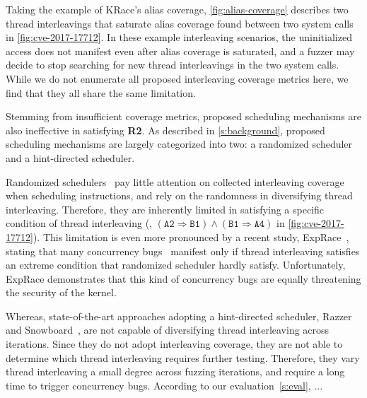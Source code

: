 Taking the example of KRace's alias coverage,
\autoref{fig:alias-coverage} describes two thread interleavings that
saturate alias coverage found between two system calls in
\autoref{fig:cve-2017-17712}.
%
In these example interleaving scenarios, the uninitialized access does
not manifest even after alias coverage is saturated, and a fuzzer may
decide to stop searching for new thread interleavings in the two
system calls.
%
While we do not enumerate all proposed interleaving coverage metrics
here, we find that they all share the same limitation.


%
Stemming from insufficient coverage metrics, proposed scheduling
mechanisms are also ineffective in satisfying \textbf{R2}.
%
As described in \autoref{s:background}, proposed scheduling mechanisms
are largely categorized into two: a randomized scheduler and a
hint-directed scheduler.

%
Randomized schedulers~\cite{krace, pctalgorithm, muzz, ski} pay little
attention on collected interleaving coverage when scheduling
instructions, and rely on the randomness in diversifying thread
interleaving.
%
Therefore, they are inherently limited in satisfying a specific
condition of thread interleaving (\eg,
$(\texttt{A2} \Rightarrow \texttt{B1}) \wedge (\texttt{B1} \Rightarrow
\texttt{A4})$ in \autoref{fig:cve-2017-17712}).
%
This limitation is even more pronounced by a recent study,
ExpRace~\cite{exprace}, stating that many concurrency
bugs~\cite{cve20196974, cve20191999, cve201911486} manifest only if
thread interleaving satisfies an extreme condition that randomized
scheduler hardly satisfy.
%
Unfortunately, ExpRace demonstrates that this kind of concurrency bugs
are equally threatening the security of the kernel.


Whereas, state-of-the-art approaches adopting a hint-directed
scheduler, Razzer~\cite{razzer} and Snowboard~\cite{snowboard}, are
not capable of diversifying thread interleaving across iterations.
%
Since they do not adopt interleaving coverage, they are not able to
determine which thread interleaving requires further
testing. Therefore, they vary thread interleaving a small degree
across fuzzing iterations, and require a long time to trigger
concurrency bugs.
%
According to our evaluation~\autoref{s:eval}, ...





